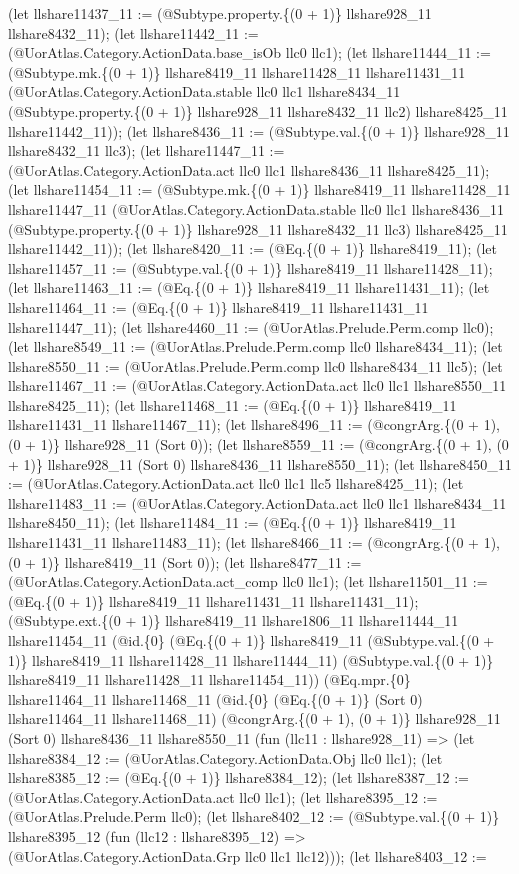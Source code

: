 \documentclass[11pt]{article}
\begin{document}
(let llshare11437\_11 := (@Subtype.property.\{(0 + 1)\} llshare928\_11 llshare8432\_11); (let llshare11442\_11 := (@UorAtlas.Category.ActionData.base\_isOb llc0 llc1); (let llshare11444\_11 := (@Subtype.mk.\{(0 + 1)\} llshare8419\_11 llshare11428\_11 llshare11431\_11 (@UorAtlas.Category.ActionData.stable llc0 llc1 llshare8434\_11 (@Subtype.property.\{(0 + 1)\} llshare928\_11 llshare8432\_11 llc2) llshare8425\_11 llshare11442\_11)); (let llshare8436\_11 := (@Subtype.val.\{(0 + 1)\} llshare928\_11 llshare8432\_11 llc3); (let llshare11447\_11 := (@UorAtlas.Category.ActionData.act llc0 llc1 llshare8436\_11 llshare8425\_11); (let llshare11454\_11 := (@Subtype.mk.\{(0 + 1)\} llshare8419\_11 llshare11428\_11 llshare11447\_11 (@UorAtlas.Category.ActionData.stable llc0 llc1 llshare8436\_11 (@Subtype.property.\{(0 + 1)\} llshare928\_11 llshare8432\_11 llc3) llshare8425\_11 llshare11442\_11)); (let llshare8420\_11 := (@Eq.\{(0 + 1)\} llshare8419\_11); (let llshare11457\_11 := (@Subtype.val.\{(0 + 1)\} llshare8419\_11 llshare11428\_11); (let llshare11463\_11 := (@Eq.\{(0 + 1)\} llshare8419\_11 llshare11431\_11); (let llshare11464\_11 := (@Eq.\{(0 + 1)\} llshare8419\_11 llshare11431\_11 llshare11447\_11); (let llshare4460\_11 := (@UorAtlas.Prelude.Perm.comp llc0); (let llshare8549\_11 := (@UorAtlas.Prelude.Perm.comp llc0 llshare8434\_11); (let llshare8550\_11 := (@UorAtlas.Prelude.Perm.comp llc0 llshare8434\_11 llc5); (let llshare11467\_11 := (@UorAtlas.Category.ActionData.act llc0 llc1 llshare8550\_11 llshare8425\_11); (let llshare11468\_11 := (@Eq.\{(0 + 1)\} llshare8419\_11 llshare11431\_11 llshare11467\_11); (let llshare8496\_11 := (@congrArg.\{(0 + 1), (0 + 1)\} llshare928\_11 (Sort 0)); (let llshare8559\_11 := (@congrArg.\{(0 + 1), (0 + 1)\} llshare928\_11 (Sort 0) llshare8436\_11 llshare8550\_11); (let llshare8450\_11 := (@UorAtlas.Category.ActionData.act llc0 llc1 llc5 llshare8425\_11); (let llshare11483\_11 := (@UorAtlas.Category.ActionData.act llc0 llc1 llshare8434\_11 llshare8450\_11); (let llshare11484\_11 := (@Eq.\{(0 + 1)\} llshare8419\_11 llshare11431\_11 llshare11483\_11); (let llshare8466\_11 := (@congrArg.\{(0 + 1), (0 + 1)\} llshare8419\_11 (Sort 0)); (let llshare8477\_11 := (@UorAtlas.Category.ActionData.act\_comp llc0 llc1); (let llshare11501\_11 := (@Eq.\{(0 + 1)\} llshare8419\_11 llshare11431\_11 llshare11431\_11); (@Subtype.ext.\{(0 + 1)\} llshare8419\_11 llshare1806\_11 llshare11444\_11 llshare11454\_11 (@id.\{0\} (@Eq.\{(0 + 1)\} llshare8419\_11 (@Subtype.val.\{(0 + 1)\} llshare8419\_11 llshare11428\_11 llshare11444\_11) (@Subtype.val.\{(0 + 1)\} llshare8419\_11 llshare11428\_11 llshare11454\_11)) (@Eq.mpr.\{0\} llshare11464\_11 llshare11468\_11 (@id.\{0\} (@Eq.\{(0 + 1)\} (Sort 0) llshare11464\_11 llshare11468\_11) (@congrArg.\{(0 + 1), (0 + 1)\} llshare928\_11 (Sort 0) llshare8436\_11 llshare8550\_11 (fun (llc11 : llshare928\_11) => (let llshare8384\_12 := (@UorAtlas.Category.ActionData.Obj llc0 llc1); (let llshare8385\_12 := (@Eq.\{(0 + 1)\} llshare8384\_12); (let llshare8387\_12 := (@UorAtlas.Category.ActionData.act llc0 llc1); (let llshare8395\_12 := (@UorAtlas.Prelude.Perm llc0); (let llshare8402\_12 := (@Subtype.val.\{(0 + 1)\} llshare8395\_12 (fun (llc12 : llshare8395\_12) => (@UorAtlas.Category.ActionData.Grp llc0 llc1 llc12))); (let llshare8403\_12 := 
\end{document}
